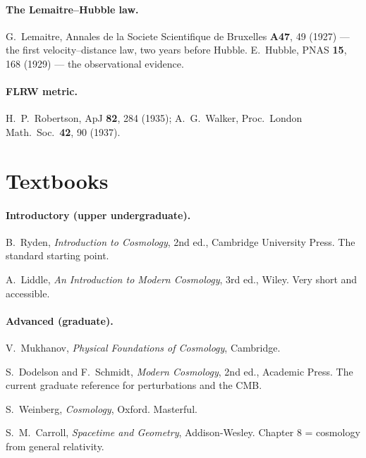 \documentclass[11pt,a4paper,openany]{report}
\begin{document}
\paragraph{The Lemaitre--Hubble law.}
G.~Lemaitre, Annales de la Societe Scientifique de Bruxelles \textbf{A47}, 49
(1927) --- the first velocity--distance law, two years before Hubble.
E.~Hubble, PNAS \textbf{15}, 168 (1929) --- the observational evidence.

\paragraph{FLRW metric.}
H.~P.~Robertson, ApJ \textbf{82}, 284 (1935); A.~G.~Walker, Proc.\ London Math.\
Soc.\ \textbf{42}, 90 (1937).

\section{Textbooks}

\paragraph{Introductory (upper undergraduate).}
\begin{description}[leftmargin=1.8cm,itemsep=2pt]
\item[Ryden 2017] B.~Ryden, \emph{Introduction to Cosmology}, 2nd ed.,
  Cambridge University Press. The standard starting point.
\item[Liddle 2015] A.~Liddle, \emph{An Introduction to Modern Cosmology},
  3rd ed., Wiley. Very short and accessible.
\end{description}

\paragraph{Advanced (graduate).}
\begin{description}[leftmargin=1.8cm,itemsep=2pt]
\item[Mukhanov 2005] V.~Mukhanov, \emph{Physical Foundations of Cosmology},
  Cambridge.
\item[Dodelson \& Schmidt 2020] S.~Dodelson and F.~Schmidt, \emph{Modern
  Cosmology}, 2nd ed., Academic Press. The current graduate reference for
  perturbations and the CMB.
\item[Weinberg 2008] S.~Weinberg, \emph{Cosmology}, Oxford. Masterful.
\item[Carroll 2004] S.~M.~Carroll, \emph{Spacetime and Geometry},
  Addison-Wesley. Chapter 8 = cosmology from general relativity.
\end{description}
\end{document}
